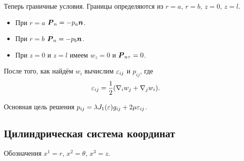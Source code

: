 Теперь граничные условия. Границы определяются из $r=a$, $r=b$, $z=0$, $z=l$.
\begin{itemize}
\item При $r=a$ $\boldsymbol{P}_n = -p_a\boldsymbol{n}$.
\item При $r=b$ $\boldsymbol{P}_n = -p_b\boldsymbol{n}$.
\item При $z=0$ и $z=l$ имеем $w_z=0$ и $\boldsymbol{P}_{n\tau} = 0$.  
\end{itemize}

После того, как найдём $w_i$  вычислим $\varepsilon_{ij}$ и $p_{ij}$, где
\[
 \varepsilon_{ij} = \frac12(\nabla_i w_j + \nabla_j w_i).
\]

Основная цель решения $p_{ij} = \lambda J_1(\varepsilon) g_{ij} + 2\mu\varepsilon_{ij}$.
\subsection{Цилиндрическая система координат}
Обозначения $x^1 = r$, $x^2 = \theta$, $x^3=z$.


